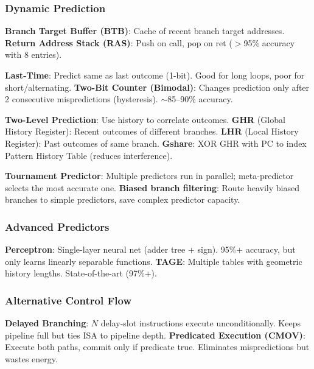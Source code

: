 \subsubsection{Dynamic Prediction}

\begin{definition}
	\textbf{Branch Target Buffer (BTB)}: Cache of recent branch target addresses.
	\textbf{Return Address Stack (RAS)}: Push on call, pop on ret ($>$95\% accuracy with 8 entries).
\end{definition}

\begin{definition}
	\textbf{Last-Time}: Predict same as last outcome (1-bit). Good for long loops, poor for short/alternating.
	\textbf{Two-Bit Counter (Bimodal)}: Changes prediction only after 2 consecutive mispredictions (hysteresis). $\sim$85--90\% accuracy.
\end{definition}

\begin{definition}
	\textbf{Two-Level Prediction}: Use history to correlate outcomes.
	\textbf{GHR} (Global History Register): Recent outcomes of different branches.
	\textbf{LHR} (Local History Register): Past outcomes of same branch.
	\textbf{Gshare}: XOR GHR with PC to index Pattern History Table (reduces interference).
\end{definition}

\begin{important}
	\textbf{Tournament Predictor}: Multiple predictors run in parallel; meta-predictor selects the most accurate one.
	\textbf{Biased branch filtering}: Route heavily biased branches to simple predictors, save complex predictor capacity.
\end{important}

\subsubsection{Advanced Predictors}

\begin{definition}
	\textbf{Perceptron}: Single-layer neural net (adder tree + sign). 95\%+ accuracy, but only learns linearly separable functions.
	\textbf{TAGE}: Multiple tables with geometric history lengths. State-of-the-art (97\%+).
\end{definition}

\subsubsection{Alternative Control Flow}

\begin{definition}
	\textbf{Delayed Branching}: $N$ delay-slot instructions execute unconditionally. Keeps pipeline full but ties ISA to pipeline depth.
	\textbf{Predicated Execution (CMOV)}: Execute both paths, commit only if predicate true. Eliminates mispredictions but wastes energy.
\end{definition}

